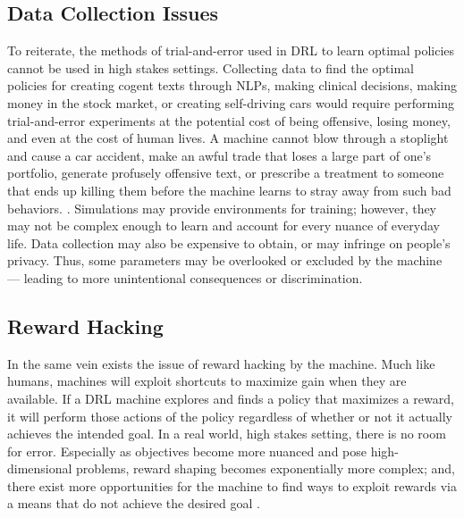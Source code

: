 \documentclass[10pt,twocolumn]{article}
\begin{document}
\subsection{Data Collection Issues}

To reiterate, the methods of trial-and-error used in DRL to learn optimal policies cannot be used in high stakes settings. Collecting data to find the optimal policies for creating cogent texts through NLPs, making clinical decisions, making money in the stock market, or creating self-driving cars would require performing trial-and-error experiments at the potential cost of being offensive, losing money, and even at the cost of human lives. A machine cannot blow through a stoplight and cause a car accident, make an awful trade that loses a large part of one's portfolio, generate profusely offensive text, or prescribe a treatment to someone that ends up killing them before the machine learns to stray away from such bad behaviors. \cite{10.1613/jair.1.12360}. Simulations may provide environments for training; however, they may not be complex enough to learn and account for every nuance of everyday life. Data collection may also be expensive to obtain, or may infringe on people's privacy. Thus, some parameters may be overlooked or excluded by the machine — leading to more unintentional consequences or discrimination.

\subsection{Reward Hacking}
In the same vein exists the issue of reward hacking by the machine. Much like humans, machines will exploit shortcuts to maximize gain when they are available. If a DRL machine explores and finds a policy that maximizes a reward, it will perform those actions of the policy regardless of whether or not it actually achieves the intended goal. In a real world, high stakes setting, there is no room for error. Especially as objectives become more nuanced and pose high-dimensional problems, reward shaping becomes exponentially more complex; and, there exist more opportunities for the machine to find ways to exploit rewards via a means that do not achieve the desired goal \cite{frye_2021}.
\end{document}

